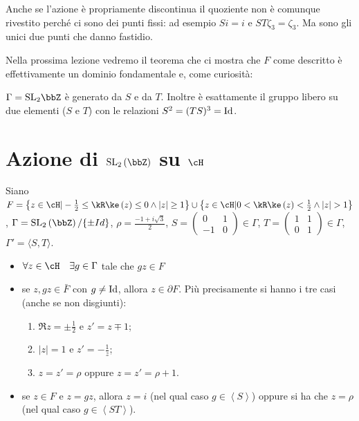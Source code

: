 Anche se l'azione è propriamente discontinua il quoziente non è comunque
rivestito perché ci sono dei punti fissi: ad esempio $Si = i$ e $ST
\zeta_3 = \zeta_3$. Ma sono gli unici due punti che danno fastidio.


Nella prossima lezione vedremo il teorema che ci mostra che $F$ come
descritto è effettivamente un dominio fondamentale e, come curiosità:
\begin{teorema}
  $\Gamma = \SL_2 \bbZ$ è generato da $S$ e da $T$. Inoltre è esattamente il
  gruppo libero su due elementi ($S$ e $T$) con le relazioni
  $S^2 = (TS)^3 = \text{Id}$.
\end{teorema}


\section{Azione di $\SL_2 \left( \bbZ \right)$ su $\cH$}

Siano $F=\left\{z \in \cH | -\frac{1}{2} \leq \Re(z) \leq 0
\wedge |z| \geq 1 \right\} \cup
\left\{z \in \cH | 0 < \Re(z) < \frac{1}{2} \wedge |z| > 1 \right\}$,
$\Gamma = \SL_2 \left( \bbZ \right)/\{\pm Id\}$,   $\rho=\frac{-1+i\sqrt{3}}{2}$,
$S=\left( \begin{array}{cc} 0 & 1 \\ -1 & 0 \end{array} \right) \in \Gamma$,
$T=\left( \begin{array}{cc} 1 & 1 \\ 0 & 1 \end{array} \right) \in \Gamma$,
$\Gamma' = \langle S, T \rangle$.

\begin{teorema}
\begin{itemize}
\item[P0] $\forall z \in \cH \quad \exists g \in \Gamma$ tale che $gz \in F$
\item[P1] se $z,gz \in \bar{F}$ con $g \neq \text{Id}$, allora $z \in \partial F$.
  Più precisamente si hanno i tre casi (anche se non disgiunti):
  \begin{enumerate}
  \item[C1] $\Re z = \pm \frac{1}{2}$ e $z' = z \mp 1$;
  \item[C2] $|z| = 1$ e $z' = - \frac{1}{z}$;
  \item[C3] $z = z' = \rho$ oppure $z = z' = \rho + 1$.
  \end{enumerate}
\item[P2] se $z \in F$ e $z=gz$,
  allora $z=i$ (nel qual caso $g \in \left\langle S \right\rangle$) oppure si ha che
  $z= \rho$ (nel qual caso $g \in \left\langle ST \right\rangle$).
\end{itemize}
\end{teorema}

